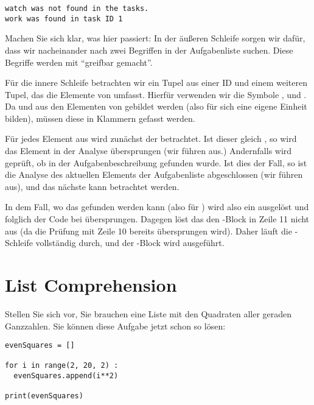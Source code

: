 \begin{cmdbox}
\begin{verbatim}
watch was not found in the tasks.
work was found in task ID 1
\end{verbatim}
\end{cmdbox}

Machen Sie sich klar, was hier passiert: In der äußeren Schleife sorgen wir dafür, dass wir nacheinander nach zwei Begriffen in der Aufgabenliste suchen. Diese Begriffe werden mit  \enquote{greifbar gemacht}.

Für die innere Schleife betrachten wir ein Tupel aus einer ID und einem weiteren Tupel, das die Elemente von  umfasst. Hierfür verwenden wir die Symbole ,  und . Da  und  aus den Elementen von  gebildet werden (also für sich eine eigene Einheit bilden), müssen diese in Klammern gefasst werden.

Für jedes Element aus  wird zunächst der  betrachtet. Ist dieser gleich , so wird das Element in der Analyse übersprungen (wir führen  aus.) Andernfalls wird geprüft, ob  in der Aufgabenbeschreibung  gefunden wurde. Ist dies der Fall, so ist die Analyse des aktuellen Elements der Aufgabenliste  abgeschlossen (wir führen  aus), und das nächste  kann betrachtet werden.

In dem Fall, wo das  gefunden werden kann (also \eg für ) wird also ein  ausgelöst und folglich der Code bei  übersprungen. Dagegen löst das  den -Block in Zeile 11 nicht aus (da die Prüfung mit Zeile 10 bereits übersprungen wird). Daher läuft die -Schleife vollständig durch, und der -Block wird ausgeführt.

\section{List Comprehension}
Stellen Sie sich vor, Sie brauchen eine Liste mit den Quadraten aller geraden Ganzzahlen. Sie können diese Aufgabe jetzt schon so lösen:

\begin{codebox}
\begin{verbatim}
evenSquares = []

for i in range(2, 20, 2) :
  evenSquares.append(i**2)

print(evenSquares)
\end{verbatim}
\end{codebox}

